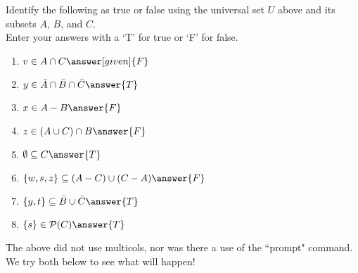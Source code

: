 \documentclass{ximera}
\begin{document}
\begin{question}
Identify the following as true or false using the universal set $U$ above and its subsets $A$, $B$, and $C$. \\ Enter your answers with a `T' for true or `F' for false.
    \begin{enumerate}
        \item $v \in A \cap C  \answer[given]{F}$
			
			\item $y \in \bar{A} \cap \bar{B} \cap \bar{C}  \answer{T}$
			
			\item $x \in A - B \answer{F} $
			
			\item $z \in (A \cup C) \cap B  \answer{F}$
			
			\item $\emptyset \subseteq C \answer{T}$
			
			\item $\{w, s, z\} \subseteq (A - C) \cup (C - A) \answer{F}$
			
			\item $\{y,t\} \subseteq \bar{B} \cup \bar{C} \answer{T}$
			
			\item $\{s\} \in \mathcal{P}(C) \answer{T}$
    \end{enumerate}

\end{question}

The above did not use multicols, nor was there a use of the ``prompt" command. We try both below to see what will happen!
\end{document}
